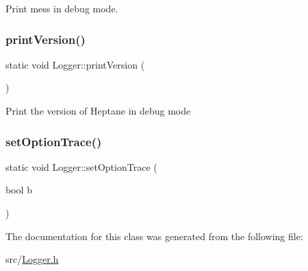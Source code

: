 Print mess in debug mode. \mbox{\label{classLogger_a17007e8d94f05800f1d5f88687ccc9a8}} 
\subsubsection{\texorpdfstring{print\+Version()}{printVersion()}}
{\footnotesize\ttfamily static void Logger\+::print\+Version (\begin{DoxyParamCaption}{ }\end{DoxyParamCaption})\hspace{0.3cm}{\ttfamily [static]}}

Print the version of Heptane in debug mode \mbox{\label{classLogger_ae03bdbeb7700b531df4cd67abec9ed0d}} 
\subsubsection{\texorpdfstring{set\+Option\+Trace()}{setOptionTrace()}}
{\footnotesize\ttfamily static void Logger\+::set\+Option\+Trace (\begin{DoxyParamCaption}\item[{bool}]{b }\end{DoxyParamCaption})\hspace{0.3cm}{\ttfamily [static]}}



The documentation for this class was generated from the following file\+:\begin{DoxyCompactItemize}
\item 
src/\hyperlink{Logger_8h}{Logger.\+h}\end{DoxyCompactItemize}

